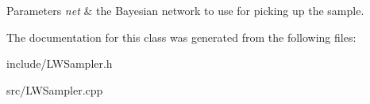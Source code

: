 \begin{DoxyParams}{Parameters}
{\em net} & the Bayesian network to use for picking up the sample. \\
\hline
\end{DoxyParams}


The documentation for this class was generated from the following files\-:\begin{DoxyCompactItemize}
\item 
include/L\-W\-Sampler.\-h\item 
src/L\-W\-Sampler.\-cpp\end{DoxyCompactItemize}

